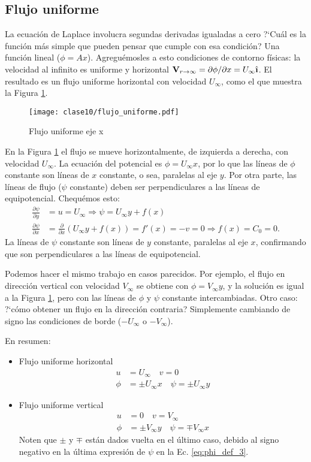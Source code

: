 \subsection*{Flujo uniforme}
La ecuación de Laplace involucra segundas derivadas igualadas a cero
\mbox{?`}Cuál es la función más simple que pueden pensar que cumple con esa condición? Una función lineal ($\phi=Ax$).
Agreguémosles a esto condiciones de contorno físicas: la velocidad al infinito es uniforme y horizontal $\mathbf{V}_{r\to\infty}=\partial\phi/\partial x=U_\infty\ihat$.
El resultado es un flujo uniforme horizontal con velocidad $U_\infty$, como el que muestra la Figura \ref{fig:flujo_uniforme}.
%
\begin{figure}[!h]
\centering
\texttt{[image: clase10/flujo\_uniforme.pdf]}
\caption{Flujo uniforme eje x}
\label{fig:flujo_uniforme}
\end{figure}

En la Figura \ref{fig:flujo_uniforme} el flujo se mueve horizontalmente, de izquierda a derecha, con velocidad $U_\infty$.
La ecuación del potencial es $\phi=U_\infty x$, por lo que las líneas de $\phi$ constante son líneas de $x$ constante, o sea, paralelas al eje $y$.
Por otra parte, las líneas de flujo ($\psi$ constante) deben ser perpendiculares a las líneas de equipotencial.
Chequémos esto:
%
\begin{align}
\frac{\partial\psi}{\partial y} &= u = U_\infty \Rightarrow \psi=U_\infty y + f(x) \nonumber \\
\frac{\partial\psi}{\partial x} &= \frac{\partial}{\partial x}\left(U_\infty y + f(x)\right) = f'(x) = -v = 0 \Rightarrow f(x) = C_0 = 0.
\end{align}
%
La líneas de $\psi$ constante son líneas de $y$ constante, paralelas al eje $x$, confirmando que son perpendiculares a las líneas de equipotencial.

Podemos hacer el mismo trabajo en casos parecidos.
Por ejemplo, el flujo en dirección vertical con velocidad $V_\infty$ se obtiene con $\phi=V_\infty y$, y la solución es igual a la Figura \ref{fig:flujo_uniforme}, pero con las líneas de $\phi$ y $\psi$ constante intercambiadas.
Otro caso: \mbox{?`}cómo obtener un flujo en la dirección contraria? Simplemente cambiando de signo las condiciones de borde ($-U_\infty$ o $-V_\infty$).

En resumen:
%
\begin{itemize}
\item Flujo uniforme horizontal
\begin{align}
u &= U_\infty \quad v = 0 \nonumber \\
\phi&=\pm U_\infty x \quad \psi= \pm U_\infty y
\end{align}

\item Flujo uniforme vertical
\begin{align}
u &= 0 \quad v = V_\infty \nonumber \\
\phi&=\pm V_\infty y \quad \psi= \mp V_\infty x
\end{align}
%
Noten que $\pm$ y $\mp$ están dados vuelta en el último caso, debido al signo negativo en la última expresión de $\psi$ en la Ec. \eqref{eq:phi_def_3}.
\end{itemize}

